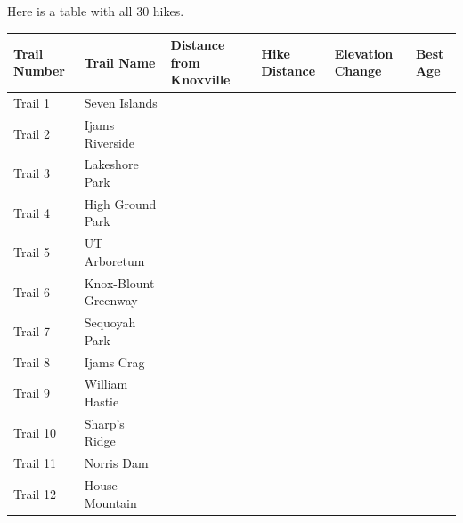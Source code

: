\documentclass[
  letterpaper,
  DIV=11,
  numbers=noendperiod]{scrreprt}
\begin{document}
Here is a table with all 30 hikes.

\begin{longtable}[]{@{}
  >{\raggedright\arraybackslash}p{}
  >{\raggedright\arraybackslash}p{}
  >{\raggedright\arraybackslash}p{}
  >{\raggedright\arraybackslash}p{}
  >{\raggedright\arraybackslash}p{}
  >{\raggedright\arraybackslash}p{}@{}}
\toprule\noalign{}
\begin{minipage}[b]{\linewidth}\raggedright
\textbf{Trail Number}
\end{minipage} & \begin{minipage}[b]{\linewidth}\raggedright
\textbf{Trail Name}
\end{minipage} & \begin{minipage}[b]{\linewidth}\raggedright
Distance from Knoxville
\end{minipage} & \begin{minipage}[b]{\linewidth}\raggedright
Hike Distance
\end{minipage} & \begin{minipage}[b]{\linewidth}\raggedright
Elevation Change
\end{minipage} & \begin{minipage}[b]{\linewidth}\raggedright
Best Age
\end{minipage} \\
\midrule\noalign{}
\endhead
\bottomrule\noalign{}
\endlastfoot
Trail 1 & Seven Islands & & & & \\
Trail 2 & Ijams Riverside & & & & \\
Trail 3 & Lakeshore Park & & & & \\
Trail 4 & High Ground Park & & & & \\
Trail 5 & UT Arboretum & & & & \\
Trail 6 & Knox-Blount Greenway & & & & \\
Trail 7 & Sequoyah Park & & & & \\
Trail 8 & Ijams Crag & & & & \\
Trail 9 & William Hastie & & & & \\
Trail 10 & Sharp's Ridge & & & & \\
Trail 11 & Norris Dam & & & & \\
Trail 12 & House Mountain & & & & \\

\end{longtable}
\end{document}
